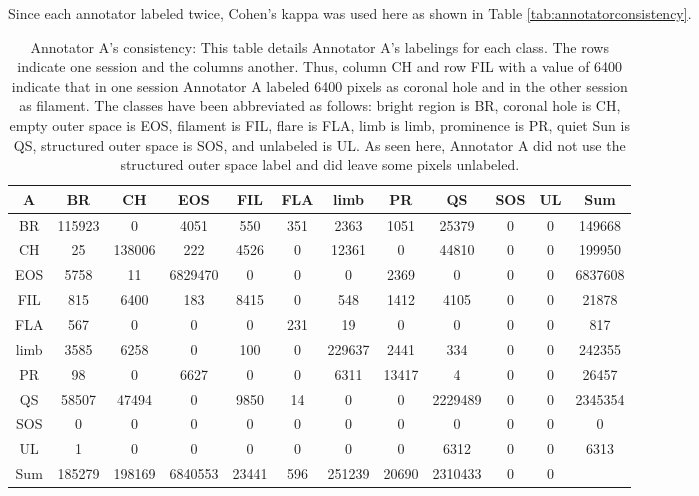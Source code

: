 \documentclass[twoside]{report}
\begin{document}
Since each annotator labeled twice, Cohen's kappa was used here as shown in Table \ref{tab:annotatorconsistency}. 

\begin{table}[ht!]
\centering
 \begin{tabular}{|c |c c c c c c c c c c | c|} 
 \hline
\textbf{A} & BR & CH & EOS & FIL & FLA & limb & PR & QS & SOS & UL & Sum \\ \hline
BR & 115923 & 0 & 4051 & 550 & 351 & 2363 & 1051 & 25379 & 0 & 0 & 149668\\
CH & 25 & 138006 & 222 & 4526 & 0 & 12361 & 0 & 44810 & 0 & 0 & 199950\\
EOS & 5758 & 11 & 6829470 & 0 & 0 & 0 & 2369 & 0 & 0 & 0 & 6837608\\
FIL & 815 & 6400 & 183 & 8415 & 0 & 548 & 1412 & 4105 & 0 & 0 & 21878\\
FLA & 567 & 0 & 0 & 0 & 231 & 19 & 0 & 0 & 0 & 0 & 817\\
limb & 3585 & 6258 & 0 & 100 & 0 & 229637 & 2441 & 334 & 0 & 0 & 242355\\
PR & 98 & 0 & 6627 & 0 & 0 & 6311 & 13417 & 4 & 0 & 0 & 26457\\
QS & 58507 & 47494 & 0 & 9850 & 14 & 0 & 0 & 2229489 & 0 & 0 & 2345354\\
SOS & 0 & 0 & 0 & 0 & 0 & 0 & 0 & 0 & 0 & 0 & 0\\
UL & 1 & 0 & 0 & 0 & 0 & 0 & 0 & 6312 & 0 & 0 & 6313\\ \hline
Sum & 185279 & 198169 & 6840553 & 23441 & 596 & 251239 & 20690 & 2310433 & 0 & 0 & \\
 \hline
 \end{tabular}
 \caption{Annotator A's consistency: This table details Annotator A's labelings for each class. The rows indicate one session and the columns another. Thus, column CH and row FIL with a value of 6400 indicate that in one session Annotator A labeled 6400 pixels as coronal hole and in the other session as filament. The classes have been abbreviated as follows: bright region is BR, coronal hole is CH, empty outer space is EOS, filament is FIL, flare is FLA, limb is limb, prominence is PR, quiet Sun is QS, structured outer space is SOS, and unlabeled is UL. As seen here, Annotator A did not use the structured outer space label and did leave some pixels unlabeled.}
 \label{tab:annotatora}
\end{table}
\end{document}
